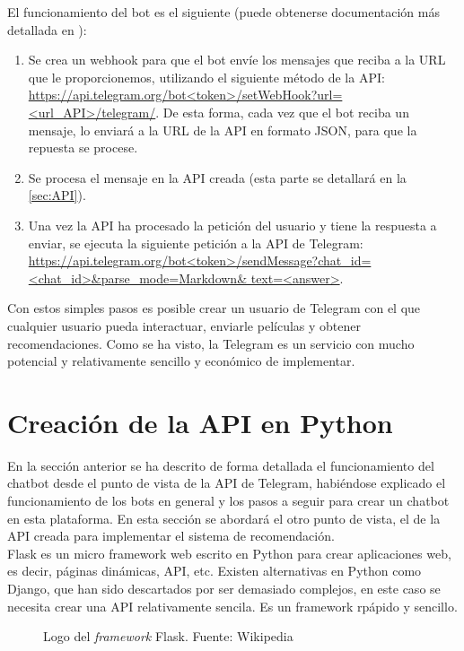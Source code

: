 El funcionamiento del bot es el siguiente (puede obtenerse documentación más detallada en \cite{Telegram}):

\begin{enumerate}
    \item Se crea un webhook para que el bot envíe los mensajes que reciba a la URL que le proporcionemos, utilizando el siguiente método de la API: \url{https://api.telegram.org/bot<token>/setWebHook?url=<url_API>/telegram/}. De esta forma, cada vez que el bot reciba un mensaje, lo enviará a la URL de la API en formato JSON, para que la repuesta se procese.
    \item Se procesa el mensaje en la API creada (esta parte se detallará en la \autoref{sec:API}).
    \item Una vez la API ha procesado la petición del usuario y tiene la respuesta a enviar, se ejecuta la siguiente petición a la API de Telegram: \url{https://api.telegram.org/bot<token>/sendMessage?chat_id=<chat_id>&parse_mode=Markdown& text=<answer>}.
\end{enumerate}

Con estos simples pasos es posible crear un usuario de Telegram con el que cualquier usuario pueda interactuar, enviarle películas y obtener recomendaciones. Como se ha visto, la Telegram es un servicio con mucho potencial y relativamente sencillo y económico de implementar.

\section{Creación de la API en Python} \label{sec:API}

En la sección anterior se ha descrito de forma detallada el funcionamiento del chatbot desde el punto de vista de la API de Telegram, habiéndose explicado el funcionamiento de los bots en general y los pasos a seguir para crear un chatbot en esta plataforma. En esta sección se abordará el otro punto de vista, el de la API creada para implementar el sistema de recomendación.\\

Flask \cite{wiki:FlaskHelloWorld} es un micro framework web escrito en Python para crear aplicaciones web, es decir, páginas dinámicas, API, etc. Existen alternativas en Python como Django, que han sido descartados por ser demasiado complejos, en este caso se necesita crear una API relativamente sencila. Es un framework rpápido y sencillo.

\begin{figure}[H]
    \centering
    \captionsetup{width=7cm}
    
    \caption{Logo del \textit{framework} Flask. Fuente: Wikipedia \cite{wiki:FlaskHelloWorld}}
\end{figure}

